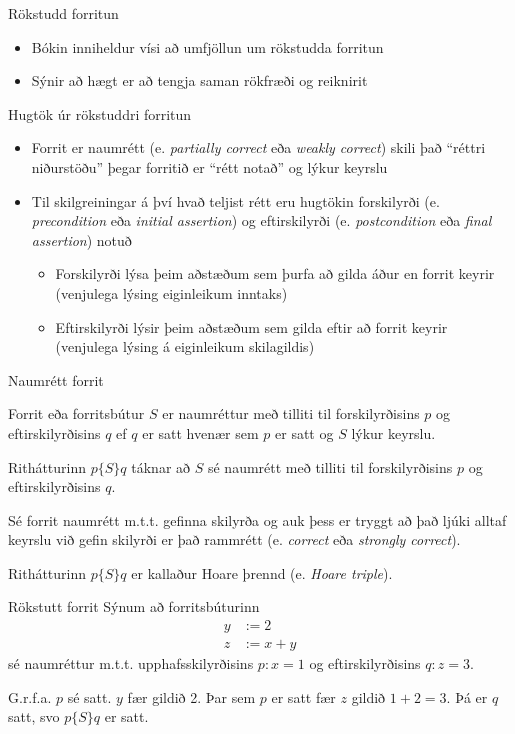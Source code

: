 \documentclass{beamer}
\begin{document}
\begin{frame}{Rökstudd forritun}
\begin{itemize}
 \item Bókin inniheldur vísi að umfjöllun um rökstudda forritun
 \item Sýnir að hægt er að tengja saman rökfræði og reiknirit
\end{itemize}
\end{frame}

\begin{frame}{Hugtök úr rökstuddri forritun}
\begin{itemize}
 \item Forrit er naumrétt (e. \emph{partially correct} eða \emph{weakly correct}) skili það ``réttri niðurstöðu'' þegar forritið er ``rétt notað'' og lýkur keyrslu
 \item Til skilgreiningar á því hvað teljist rétt eru hugtökin forskilyrði (e. \emph{precondition} eða \emph{initial assertion}) og eftirskilyrði (e. \emph{postcondition} eða \emph{final assertion}) notuð
 \begin{itemize}
  \item Forskilyrði lýsa þeim aðstæðum sem þurfa að gilda áður en forrit keyrir (venjulega lýsing eiginleikum inntaks)
  \item Eftirskilyrði lýsir þeim aðstæðum sem gilda eftir að forrit keyrir (venjulega lýsing á eiginleikum skilagildis)
 \end{itemize}
\end{itemize}
\end{frame}

\begin{frame}{Naumrétt forrit}
\begin{tcolorbox}[title=Naumrétt forrit]
Forrit eða forritsbútur $S$ er naumréttur með tilliti til forskilyrðisins $p$ og eftirskilyrðisins $q$ ef $q$ er satt hvenær sem $p$ er satt og $S$ lýkur keyrslu.

Rithátturinn $p\{S\}q$ táknar að $S$ sé naumrétt með tilliti til forskilyrðisins $p$ og eftirskilyrðisins $q$.
\end{tcolorbox}
Sé forrit naumrétt m.t.t. gefinna skilyrða og auk þess er tryggt að það ljúki alltaf keyrslu við gefin skilyrði er það rammrétt (e. \emph{correct} eða \emph{strongly correct}).

Rithátturinn $p\{S\}q$ er kallaður Hoare þrennd (e. \emph{Hoare triple}).
\end{frame}

\begin{frame}{Rökstutt forrit}
Sýnum að forritsbúturinn
\begin{align*}
y &:= 2\\
z &:= x + y
\end{align*}
sé naumréttur m.t.t. upphafsskilyrðisins $p: x = 1$ og eftirskilyrðisins $q: z = 3$. \pause

G.r.f.a. $p$ sé satt. $y$ fær gildið 2. Þar sem $p$ er satt fær $z$ gildið $1+2 = 3$. Þá er $q$ satt, svo $p\{S\}q$ er satt.
\end{frame}
\end{document}
